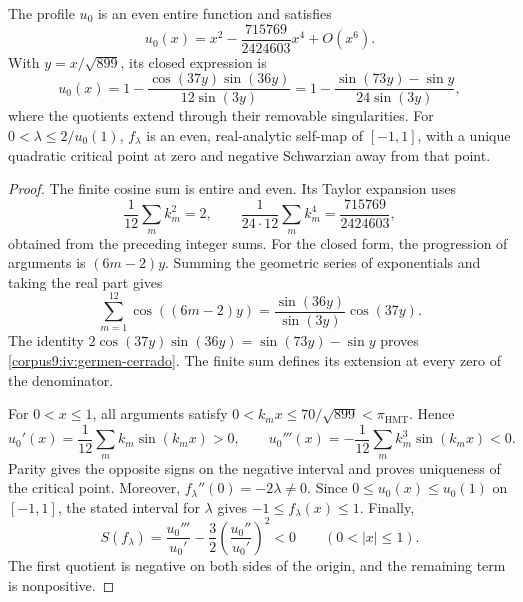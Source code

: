\begin{proposition}
\label{corpus9:iv:germen-analitico}
The profile \(u_0\) is an even entire function and satisfies
\[
 u_0(x)=x^2-\frac{715769}{2424603}x^4+O(x^6).
\]
With \(y=x/\sqrt{899}\), its closed expression is
\begin{equation}
 u_0(x)
  =1-\frac{\cos(37y)\sin(36y)}{12\sin(3y)}
  =1-\frac{\sin(73y)-\sin y}{24\sin(3y)},
 \label{corpus9:iv:germen-cerrado}
\end{equation}
where the quotients extend through their removable singularities.
For \(0<\lambda\leq2/u_0(1)\), \(f_\lambda\) is an even,
real-analytic self-map of \([-1,1]\), with a unique
quadratic critical point at zero and negative Schwarzian
away from that point.
\end{proposition}
\begin{proof}
The finite cosine sum is entire and even. Its Taylor
expansion uses
\[
 \frac1{12}\sum_m k_m^2=2,\qquad
 \frac1{24\cdot12}\sum_m k_m^4=\frac{715769}{2424603},
\]
obtained from the preceding integer sums. For the closed
form, the progression of arguments is \((6m-2)y\). Summing
the geometric series of exponentials and taking the real part gives
\[
 \sum_{m=1}^{12}\cos((6m-2)y)
   =\frac{\sin(36y)}{\sin(3y)}\cos(37y).
\]
The identity \(2\cos(37y)\sin(36y)=\sin(73y)-\sin y\)
proves \eqref{corpus9:iv:germen-cerrado}. The finite sum defines
its extension at every zero of the denominator.

For \(0<x\leq1\), all arguments satisfy
\(0<k_mx\leq70/\sqrt{899}<\pi_{\mathrm{HMT}}\). Hence
\[
 u_0'(x)=\frac1{12}\sum_m k_m\sin(k_mx)>0,\qquad
 u_0'''(x)=-\frac1{12}\sum_m k_m^3\sin(k_mx)<0.
\]
Parity gives the opposite signs on the negative interval
and proves uniqueness of the critical point. Moreover,
\(f_\lambda''(0)=-2\lambda\ne0\). Since
\(0\leq u_0(x)\leq u_0(1)\) on \([-1,1]\), the stated
interval for \(\lambda\) gives
\(-1\leq f_\lambda(x)\leq1\). Finally,
\[
 S(f_\lambda)
  =\frac{u_0'''}{u_0'}
   -\frac32\left(\frac{u_0''}{u_0'}\right)^2<0
 \qquad(0<|x|\leq1).
\]
The first quotient is negative on both sides of the origin,
and the remaining term is nonpositive.
\end{proof}

